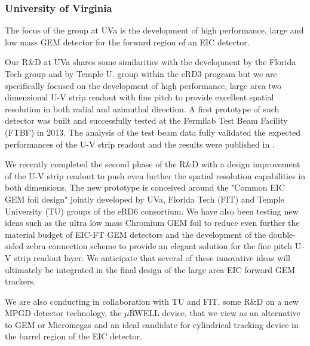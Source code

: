 \subsubsection{University of Virginia} 
The focus of the group at UVa is the development of high performance, large and low mass GEM detector  for the forward region of an EIC detector. 

Our R\&D  at UVa shares some similarities with the development by the Florida Tech group and by Temple U. group within the eRD3 program but we are specifically focused on the development of high performance, large area two dimensional U-V strip readout with fine pitch to provide excellent spatial resolution in both radial and azimuthal direction. A first prototype of such detector was built and successfully tested at the Fermilab Test Beam Facility (FTBF) in 2013. The analysis of the test beam data fully validated the expected performances of the U-V strip readout and the results were published in \cite{Gnanvo:2015xda}. 

We  recently completed the second phase of the R\&D with a design improvement of the U-V strip readout to push even further the spatial resolution capabilities in both dimensions. The new prototype is conceived around the "Common EIC GEM foil design" jointly developed by UVa, Florida Tech (FIT)  and Temple University (TU) groups of the eRD6 consortium. We have also been testing new ideas such as the ultra low mass Chromium GEM foil to reduce even further the material budget of EIC-FT GEM detectors and the development of the double-sided zebra connection scheme to provide an elegant solution for the fine pitch U-V strip readout layer. We anticipate that several of these innovative ideas will ultimately be integrated in the final design of the large area EIC  forward GEM trackers.

We are also conducting in collaboration with TU and FIT, some R\&D on a new MPGD detector technology, the $\mu$RWELL device, that we view as an alternative to GEM or Micromegas and an ideal candidate for cylindrical tracking device in the barrel region of the EIC detector. 


